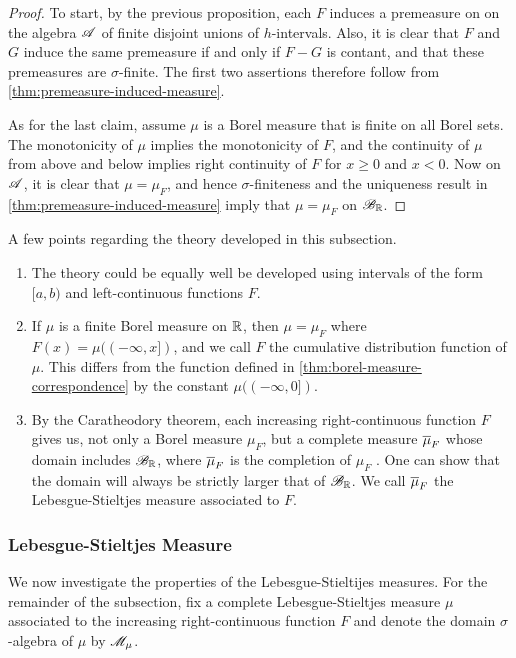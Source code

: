 \documentclass[12pt]{article} %
\begin{document}
\begin{proof}
    To start, by the previous proposition, each $F$ induces a premeasure on on the algebra $\mathscr{A}$ of finite disjoint unions of $h$-intervals. Also, it is clear that $F$ and $G$ induce the same premeasure if and only if $F - G$ is contant, and that these premeasures are $\sigma$-finite. The first two assertions therefore follow from \cref{thm:premeasure-induced-measure}. 

    As for the last claim, assume $\mu$ is a Borel measure that is finite on all Borel sets. The monotonicity of $\mu$ implies the monotonicity of $F$, and the continuity of $\mu$ from above and below implies right continuity of $F$ for $x \geq 0$ and $x < 0$. Now on $\mathscr{A}$, it is clear that $\mu = \mu_F$, and hence $\sigma$-finiteness and the uniqueness result in \cref{thm:premeasure-induced-measure} imply that $\mu = \mu_F$ on $\mathscr{B}_{\mathbb{R}}$.
\end{proof}

\begin{remark}
    A few points regarding the theory developed in this subsection.
    \begin{enumerate}
        \item The theory could be equally well be developed using intervals of the form $[a, b)$ and left-continuous functions $F$.
        \item If $\mu$ is a finite Borel measure on $\mathbb{R}$, then $\mu = \mu_F$ where $F(x) = \mu((-\infty, x])$, and we call $F$ the cumulative distribution function of $\mu$. This differs from the function defined in \cref{thm:borel-measure-correspondence} by the constant $\mu((-\infty, 0])$.
        \item By the Caratheodory theorem, each increasing right-continuous function $F$ gives us, not only a Borel measure $\mu_F$, but a complete measure $\overline{\mu}_F$ whose domain includes $\mathscr{B}_{\mathbb{R}}$, where $\overline{\mu}_F$ is the completion of $\mu_F$ \citep[Exercise~22a]{folland1999real}. One can show that the domain will always be strictly larger that of $\mathscr{B}_{\mathbb{R}}$. We call $\overline{\mu}_F$ the Lebesgue-Stieltjes measure associated to $F$.
    \end{enumerate}
\end{remark}

\subsubsection{Lebesgue-Stieltjes Measure}

We now investigate the properties of the Lebesgue-Stieltijes measures. For the remainder of the subsection, fix a complete Lebesgue-Stieltjes measure $\mu$ associated to the increasing right-continuous function $F$ and denote the domain $\sigma$-algebra of $\mu$ by $\mathscr{M}_\mu$.
\end{document}
